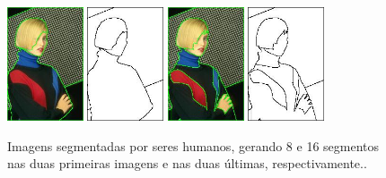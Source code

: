 \begin{figure}[!htb]
 \centering
 \def\baselinestretch{1}\small\normalsize
 \includegraphics[width=0.2\textwidth]{img/198023-8-color.jpg}\qquad
 \includegraphics[width=0.2\textwidth]{img/198023-8.jpg}  \qquad
  \includegraphics[width=0.2\textwidth]{img/198023-16-color.jpg}  \qquad
 \includegraphics[width=0.2\textwidth]{img/198023-16.jpg}        
 \caption{\label{fig:Berkeley_mulher_segmentada}Imagens segmentadas por seres humanos, gerando 8 e 16 segmentos nas duas primeiras imagens e nas duas últimas, respectivamente.\citep{Arbelez2011}.}
\end{figure}


